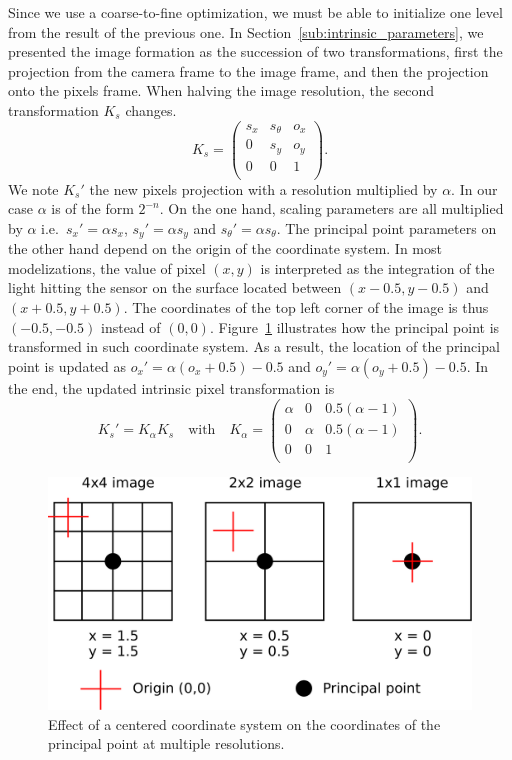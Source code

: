 Since we use a coarse-to-fine optimization,
we must be able to initialize one level from the result of the previous one.
In Section~\ref{sub:intrinsic_parameters}, we presented the image formation as
the succession of two transformations, first the projection from the camera frame
to the image frame, and then the projection onto the pixels frame.
When halving the image resolution, the second transformation $K_s$ changes.
\[
	K_s = \begin{pmatrix}
		s_x & s_{\theta} & o_x \\
		0 & s_y & o_y \\
		0 & 0 & 1 \\
	\end{pmatrix}.
\]
We note $K_s'$ the new pixels projection with a resolution multiplied by $\alpha$.
In our case $\alpha$ is of the form $2^{-n}$.
On the one hand, scaling parameters are all multiplied by $\alpha$ i.e.\
$s_x' = \alpha s_x$,
$s_y' = \alpha s_y$ and
$s_{\theta}' = \alpha s_{\theta}$.
The principal point parameters on the other hand depend on the origin of the coordinate system.
In most modelizations, the value of pixel $(x,y)$ is interpreted as the integration
of the light hitting the sensor on the surface located between $(x-0.5, y-0.5)$
and $(x+0.5, y+0.5)$.
The coordinates of the top left corner of the image is thus $(-0.5, -0.5)$
instead of $(0,0)$.
Figure~\ref{fig:multiscale-intrinsics} illustrates how
the principal point is transformed in such coordinate system.
As a result, the location of the principal point is updated as
$o_x' = \alpha(o_x + 0.5) - 0.5$ and
$o_y' = \alpha(o_y + 0.5) - 0.5$.
In the end, the updated intrinsic pixel transformation is
\[
	K_s' = K_{\alpha}K_s \quad \text{with} \quad
	K_{\alpha} = \begin{pmatrix}
		\alpha & 0 & 0.5(\alpha - 1) \\
		0 & \alpha & 0.5(\alpha - 1) \\
		0 & 0 & 1 \\
	\end{pmatrix}.
\]

\begin{figure}[t]
	\centering
	\includegraphics[width=\linewidth]{assets/img/multiscale-intrinsics.pdf}
	\caption{Effect of a centered coordinate system on
	the coordinates of the principal point at multiple resolutions.}%
	\label{fig:multiscale-intrinsics}
\end{figure}

